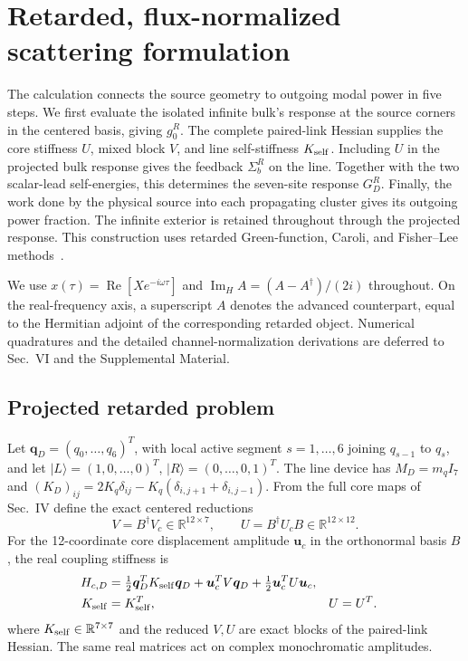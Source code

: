 \documentclass[10pt,aps,pre,reprint,floatfix,notitlepage,nofootinbib]{revtex4-2}
\newcommand{\vu}{\bm{u}}
\newcommand{\vq}{\bm{q}}
\newcommand{\ImH}{\operatorname{Im}_{\!H}}
\begin{document}
\section{Retarded, flux-normalized scattering formulation}
\label{sec:s5-scattering}

The calculation connects the source geometry to outgoing modal power in five steps. We first evaluate the isolated infinite bulk's response at the source corners in the centered basis, giving $g_0^R$. The complete paired-link Hessian supplies the core stiffness $U$, mixed block $V$, and line self-stiffness $K_{\rm self}$. Including $U$ in the projected bulk response gives the feedback $\Sigma_b^R$ on the line. Together with the two scalar-lead self-energies, this determines the seven-site response $G_D^R$. Finally, the work done by the physical source into each propagating cluster gives its outgoing power fraction. The infinite exterior is retained throughout through the projected response. This construction uses retarded Green-function, Caroli, and Fisher--Lee methods~\cite{BornHuang1954,Caroli1971,FisherLee1981,Sadasivam2017,Ong2018,Khodavirdi2024}.

We use
$x(\tau)=\operatorname{Re}[Xe^{-i\omega\tau}]$ and
$\ImH A=(A-A^\dagger)/(2i)$ throughout. On the real-frequency axis, a superscript $A$ denotes the advanced counterpart, equal to the Hermitian adjoint of the corresponding retarded object. Numerical quadratures and the detailed channel-normalization derivations are deferred to Sec.~VI and the Supplemental Material.

\subsection{Projected retarded problem}
\label{sec:s5-projected}

Let $\vq_D=(q_0,\ldots,q_6)^T$, with local active segment $s=1,\ldots,6$ joining $q_{s-1}$ to $q_s$, and let $|L\rangle=(1,0,\ldots,0)^T$, $|R\rangle=(0,\ldots,0,1)^T$.  The line device has $M_D=m_qI_7$ and $(K_D)_{ij}=2K_q\delta_{ij}-K_q(\delta_{i,j+1}+\delta_{i,j-1})$.  From the full core maps of Sec.~IV define the exact centered reductions
\begin{equation}
  V=B^\dagger V_c\in\mathbb R^{12\times7},
  \qquad
  U=B^\dagger U_cB\in\mathbb R^{12\times12}.
  \label{eq:s5-reduced-source-matrices}
\end{equation}
For the 12-coordinate core displacement amplitude $\vu_c$ in the orthonormal basis $B$, the real coupling stiffness is
\begin{align}
 H_{c,D}
 &=\tfrac12\vq_D^T K_{\rm self}\vq_D
 +\vu_c^T V\vq_D
 +\tfrac12\vu_c^T U\vu_c,\\
 K_{\rm self}&=K_{\rm self}^T,
 &U&=U^T.
 \label{eq:s5-block-stiffness}
\end{align}
where $K_{\rm self}\in\mathbb R^{7\times7}$ and the reduced $V,U$ are exact blocks of the paired-link Hessian.  The same real matrices act on complex monochromatic amplitudes.
\end{document}

